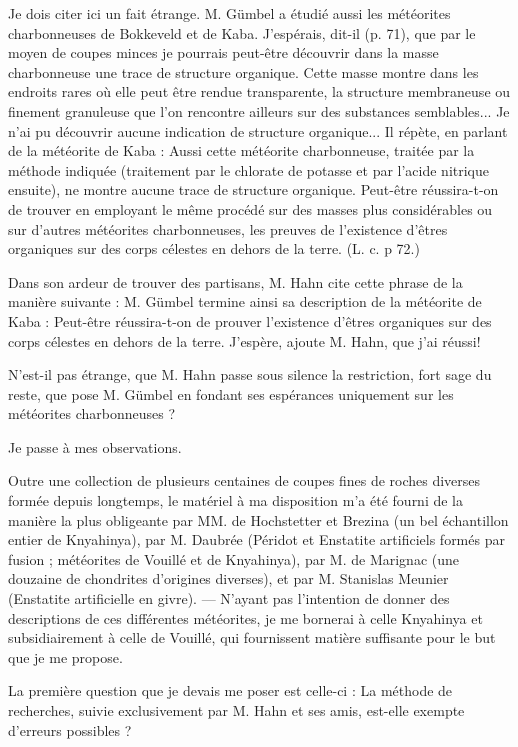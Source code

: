\documentclass[a4paper, 12pt, oneside, french]{book}
\begin{document}
Je dois citer ici un fait étrange. M. Gümbel a étudié aussi les météorites charbonneuses de Bokkeveld et de Kaba. \og J'espérais, dit-il (p. 71), que par le moyen de coupes minces je pourrais peut-être découvrir dans la masse charbonneuse une trace de structure organique. Cette masse montre dans les endroits rares où elle peut être rendue transparente, la structure membraneuse ou finement granuleuse que l'on rencontre ailleurs sur des substances semblables... \fg \og Je n'ai pu découvrir aucune indication de structure organique... \fg Il répète, en parlant de la météorite de Kaba : \og Aussi cette météorite charbonneuse, traitée par la méthode indiquée (traitement par le chlorate de potasse et par l'acide nitrique ensuite), ne montre aucune trace de structure organique. Peut-être réussira-t-on de trouver en employant le même procédé sur des masses plus considérables ou sur d'autres météorites charbonneuses, les preuves de l'existence d'êtres organiques sur des corps célestes en dehors de la terre. \fg (L. c. p 72.)

Dans son ardeur de trouver des partisans, M. Hahn cite cette phrase de la manière suivante : \og M. Gümbel termine ainsi sa description de la météorite de Kaba : \og Peut-être réussira-t-on de prouver l'existence d'êtres organiques sur des corps célestes en dehors de la terre. \fg J'espère, ajoute M. Hahn, que j'ai réussi! \fg

N'est-il pas étrange, que M. Hahn passe sous silence la restriction, fort sage du reste, que pose M. Gümbel en fondant ses espérances uniquement sur les météorites charbonneuses ?

Je passe à mes observations.

Outre une collection de plusieurs centaines de coupes fines de roches diverses formée depuis longtemps, le matériel à ma disposition m'a été fourni de la manière la plus obligeante par MM. de Hochstetter et Brezina (un bel échantillon entier de Knyahinya), par M. Daubrée (Péridot et Enstatite artificiels formés par fusion ; météorites de Vouillé et de Knyahinya), par M. de Marignac (une douzaine de chondrites d'origines diverses), et par M. Stanislas Meunier (Enstatite artificielle en givre). --- N'ayant pas l'intention de donner des descriptions de ces différentes météorites, je me bornerai à celle Knyahinya et subsidiairement à celle de Vouillé, qui fournissent matière suffisante pour le but que je me propose.

La première question que je devais me poser est celle-ci : La méthode de recherches, suivie exclusivement par M. Hahn et ses amis, est-elle exempte d'erreurs possibles ?
\end{document}
